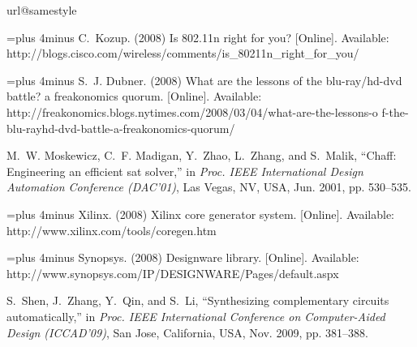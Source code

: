 \documentclass[journal]{IEEEtran}
\begin{document}
\begin{thebibliography}{49}
\providecommand{\url}[1]{#1}
\csname url@samestyle\endcsname
\providecommand{\newblock}{\relax}
\providecommand{\bibinfo}[2]{#2}
\providecommand{\BIBentrySTDinterwordspacing}{\spaceskip=0pt\relax}
\providecommand{\BIBentryALTinterwordstretchfactor}{4}
\providecommand{\BIBentryALTinterwordspacing}{\spaceskip=\fontdimen2\font plus
\BIBentryALTinterwordstretchfactor\fontdimen3\font minus
  \fontdimen4\font\relax}
\providecommand{\BIBforeignlanguage}[2]{{%
\expandafter\ifx\csname l@#1\endcsname\relax
\typeout{** WARNING: IEEEtran.bst: No hyphenation pattern has been}%
\typeout{** loaded for the language `#1'. Using the pattern for}%
\typeout{** the default language instead.}%
\else
\language=\csname l@#1\endcsname
\fi
#2}}
\providecommand{\BIBdecl}{\relax}
\BIBdecl

\BIBentryALTinterwordspacing
C.~Kozup. (2008) Is 802.11n right for you? [Online]. Available:
  \url{http://blogs.cisco.com/wireless/comments/is_80211n_right_for_you/}
\BIBentrySTDinterwordspacing

\BIBentryALTinterwordspacing
S.~J. Dubner. (2008) What are the lessons of the blu-ray/hd-dvd battle? a
  freakonomics quorum. [Online]. Available:
  \url{http://freakonomics.blogs.nytimes.com/2008/03/04/what-are-the-lessons-o%
f-the-blu-rayhd-dvd-battle-a-freakonomics-quorum/}
\BIBentrySTDinterwordspacing

M.~W. Moskewicz, C.~F. Madigan, Y.~Zhao, L.~Zhang, and S.~Malik, ``Chaff:
  Engineering an efficient sat solver,'' in \emph{Proc. {IEEE} International
  Design Automation Conference ({DAC}'01)}, Las Vegas, NV, USA, Jun. 2001, pp.
  530--535.

\BIBentryALTinterwordspacing
Xilinx. (2008) Xilinx core generator system. [Online]. Available:
  \url{http://www.xilinx.com/tools/coregen.htm}
\BIBentrySTDinterwordspacing

\BIBentryALTinterwordspacing
Synopsys. (2008) Designware library. [Online]. Available:
  \url{http://www.synopsys.com/IP/DESIGNWARE/Pages/default.aspx}
\BIBentrySTDinterwordspacing

S.~Shen, J.~Zhang, Y.~Qin, and S.~Li, ``Synthesizing complementary circuits
  automatically,'' in \emph{Proc. {IEEE} International Conference on
  Computer-Aided Design ({ICCAD}'09)}, San Jose, California, USA, Nov. 2009,
  pp. 381--388.


\end{thebibliography}
\end{document}
